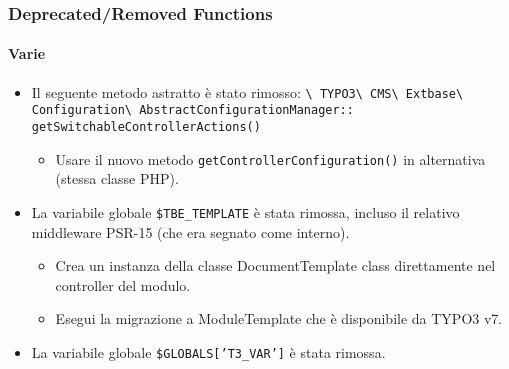 \begin{frame}[fragile]
	\frametitle{Deprecated/Removed Functions}
	\framesubtitle{Varie}

	\begin{itemize}

		\item Il seguente metodo astratto è stato rimosso:\newline
			\smaller
				\texttt{\textbackslash
					TYPO3\textbackslash
					CMS\textbackslash
					Extbase\textbackslash
					Configuration\textbackslash
					AbstractConfigurationManager::}\newline
					\texttt{getSwitchableControllerActions()}
			\normalsize

			\begin{itemize}\smaller
				\item[\ding{228}] Usare il nuovo metodo \texttt{getControllerConfiguration()} in alternativa (stessa classe PHP).
			\end{itemize}\normalsize

		\item La variabile globale \texttt{\$TBE\_TEMPLATE} è stata rimossa, incluso
			il relativo middleware PSR-15 (che era segnato come interno).

			\begin{itemize}\smaller
				\item[\ding{228}] Crea un instanza della classe DocumentTemplate class direttamente nel controller del modulo.
				\item[\ding{228}] Esegui la migrazione a ModuleTemplate che è disponibile da TYPO3 v7.
			\end{itemize}\normalsize

		\item La variabile globale \texttt{\$GLOBALS['T3\_VAR']} è stata rimossa.\newline

	\end{itemize}

\end{frame}

